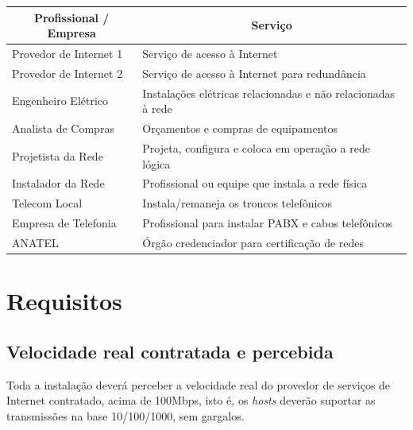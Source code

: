 \documentclass[	DIV=calc,%
							paper=a4,%
							fontsize=12pt,%
							onecolumn]{scrartcl}	 					%
\begin{document}
\begin{table}[H]
	\centering
	\renewcommand{\arraystretch}{2.0}
	\begin{tabular}{|l|l|}
		\hline
		\multicolumn{1}{|c|}{\textbf{Profissional / Empresa}} &	 \multicolumn{1}{|c|}{\textbf{Serviço}}                                 		  \\ \hline		Provedor de Internet 1                                
		& Serviço de acesso à Internet                                              \\ \hline
	    Provedor de Internet 2                               
	    & Serviço de acesso à Internet para redundância            					\\ \hline
		Engenheiro Elétrico                                  
		& Instalações elétricas relacionadas e não relacionadas à rede          \\ \hline
		Analista de Compras 
        & Orçamentos e compras de equipamentos          \\ \hline
		Projetista da Rede                                   
		& Projeta, configura e coloca em operação a rede lógica    \\ \hline
		Instalador da Rede                                   
		& Profissional ou equipe que instala a rede física           \\ \hline
		Telecom Local                                        
		& Instala/remaneja os troncos telefônicos         \\ \hline
		Empresa de Telefonia                                    
		& Profissional para instalar PABX e cabos telefônicos    \\ \hline
		ANATEL                                  
		& Órgão credenciador para certificação de redes \\ \hline
	\end{tabular}
\end{table}



\section{Requisitos}

\subsection{Velocidade real contratada e percebida}
Toda a instalação deverá perceber a velocidade real do provedor de serviços de Internet contratado, acima de 100Mbps, isto é, os \textit{hosts} deverão suportar as transmissões na base 10/100/1000, sem gargalos.
\end{document}
